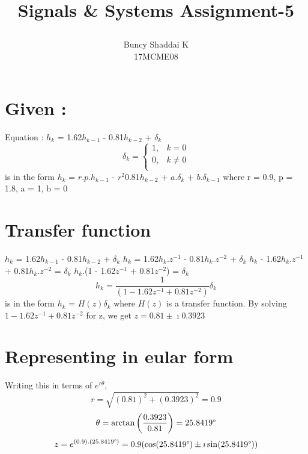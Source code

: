 \documentclass[a4paper,12pt]{article}
\title{
  \begin{large}
    Signals \& Systems
    Assignment-5
  \end{large}
}
\author{Buncy Shaddai K \\ 17MCME08}
\begin{document}
\maketitle

  \section{Given : }
    Equation : $h_k$ = 1.62$h_{k-1}$ - 0.81$h_{k-2}$ + $\delta_k$
    \newline
    \[
    \delta_k = 
      \left\{
        \begin{array}{ll}
          1, & k = 0 \\
          0, & k \neq 0\\
        \end{array}
      \right.
    \]
    is in the form  $h_k$ = $r.p.h_{k-1}$ - $r^2$0.81$h_{k-2}$ +  $a.\delta_k$ + $b.\delta_{k-1}$
    \newline
    \hspace{40mm} where r = 0.9, p = 1.8, a = 1, b = 0

    \section{Transfer function}
      $h_k$ = 1.62$h_{k-1}$ - 0.81$h_{k-2}$ + $\delta_k$
      \newline
      $h_k$ = 1.62$h_k.z^{-1}$ - 0.81$h_k.z^{-2}$ + $\delta_k$
      \newline
      $h_k$ - 1.62$h_k.z^{-1}$ + 0.81$h_k.z^{-2}$ = $\delta_k$
      \newline
      $h_k$.(1 - 1.62$z^{-1}$ + 0.81$z^{-2}$) = $\delta_k$
      \newline
        \begin{equation}
          h_k = \frac{1}{(1 - 1.62z^{-1} + 0.81z^{-2})}\delta_k
        \end{equation}
      \hspace{36mm}  is in the form  $h_k$ = $H(z)\delta_k$
      \newline
      where $H(z)$ is a transfer function.
      \newline\newline
      By solving $1 - 1.62z^{-1} + 0.81z^{-2}$  for z, we get
      \newline
      $z = 0.81\pm\imath0.3923$

    \section{Representing in eular form}
      Writing this in terms of $e^{r\theta},$\newline
      \[
        r = \sqrt{(0.81)^2 + (0.3923)^2}
          = 0.9
      \]
      \[
        \theta = \arctan\left(\frac{0.3923}{0.81}\right)
               = 25.8419\degree
      \]
      \begin{equation}
        z = e^{(0.9).(25.8419\degree)} = 0.9(\cos(25.8419\degree)\pm\imath\sin(25.8419\degree))
      \end{equation}
\end{document}
